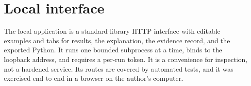\documentclass[11pt,letterpaper]{article}
\begin{document}
\section{Local interface}
The local application is a standard-library HTTP interface with editable examples and tabs for results, the explanation, the evidence record, and the exported Python. It runs one bounded subprocess at a time, binds to the loopback address, and requires a per-run token. It is a convenience for inspection, not a hardened service. Its routes are covered by automated tests, and it was exercised end to end in a browser on the author's computer.
\end{document}
